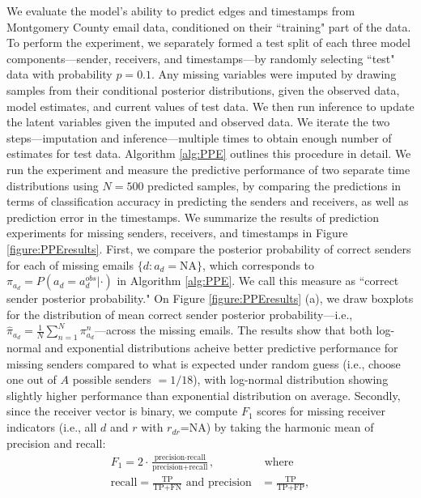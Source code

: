 \documentclass[ba]{imsart}
\numberwithin{equation}{section}
\theoremstyle{plain}
\begin{document}
	We evaluate the model's ability to predict edges and timestamps from Montgomery County email data, conditioned on their ``training" part of the data. To perform the experiment, we separately formed a test split of each three model components---sender, receivers, and timestamps---by randomly selecting ``test" data with probability $p=0.1$. Any missing variables were imputed by drawing samples from their conditional posterior distributions, given the observed data, model estimates, and current values of test data. We then run inference to update the latent variables given the imputed and observed data. We iterate the two steps---imputation and inference---multiple times to obtain enough number of estimates for test data. Algorithm \ref{alg:PPE} outlines this procedure in detail. We run the experiment and measure the predictive performance of two separate time distributions using $N=500$ predicted samples, by comparing the predictions in terms of classification accuracy in predicting the senders and receivers, as well as prediction error in the timestamps. We summarize the results of prediction experiments for missing senders, receivers, and timestamps in Figure \ref{figure:PPEresults}. First, we compare the posterior probability of correct senders for each of missing emails $\{d:a_d=\mbox{NA}\}$, which corresponds to $\pi_{a_{d}}=P(a_{d} = a^{obs}_{d}|\cdot)$ in Algorithm \ref{alg:PPE}. We call this measure as ``correct sender posterior probability." On Figure \ref{figure:PPEresults} (a), we draw boxplots for the distribution of mean correct sender posterior probability---i.e., $\hat{\pi}_{a_{d}} = \frac{1}{N}\sum_{n=1}^N \pi^n_{a_{d}}$---across the missing emails. The results show that both log-normal and exponential distributions acheive better predictive performance for missing senders compared to what is expected under random guess (i.e., choose one out of $A$ possible senders $=1/18$), with log-normal distribution showing slightly higher performance than exponential distribution on average. Secondly, since the receiver vector is binary, we compute $F_1$ scores for missing receiver indicators (i.e., all $d$ and $r$ with $r_{dr}$=NA) by taking the harmonic mean of precision and recall:
	\begin{equation}
	\begin{aligned}
	F_1 =2\cdot\frac{\mbox{precision}\cdot \mbox{recall}}{\mbox{precision}+ \mbox{recall}}, &\mbox{ where } \\
			\mbox{recall}  = \frac{\mbox{TP}}{\mbox{TP+FN}} \mbox{ and } \mbox{precision} & =\frac{\mbox{TP}}{\mbox{TP+FP}},
			\end{aligned}
	\end{equation}
\end{document}

